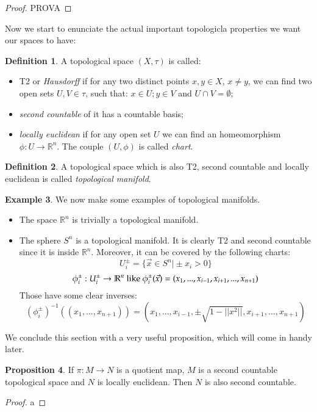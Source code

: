 \documentclass[12pt,a4paper]{report}
\theoremstyle{definition}
\newtheorem{Def}{Definition}[chapter]
\theoremstyle{Theorem}
\newtheorem{Prop}[Def]{Proposition}
\theoremstyle{break}
\newtheorem{Ex}[Def]{Example}
\theoremstyle{definition}
\begin{document}
			\begin{proof}
				PROVA
			\end{proof}
			Now we start to enunciate the actual important topologicla properties we want our spaces to have:
			\begin{Def}
				A topological space $(X,\tau)$ is called:
				\begin{itemize}
					\item T2 or \textit{Hausdorff} if for any two distinct points $x,y\in X$, $x\neq y$, we can find two open sets $U,V\in \tau$, such that: $x\in U;y\in V$ and $U\cap V=\emptyset$;
					\item \textit{second countable} of it has a countable basis;
					\item \textit{locally euclidean} if for any open set $U$ we can find an homeomorphism $\phi:U\rightarrow \mathbb{R}^n$. The couple $(U,\phi)$ is called \textit{chart}.	
				\end{itemize}
			\end{Def}
			\begin{Def}
				A topological space which is also T2, second countable and locally euclidean is called \textit{topological manifold}.
			\end{Def}
			\begin{Ex}
				We now make some examples of topological manifolds.
				\begin{itemize}
					\item The space $\mathbb{R}^n$ is trivially a topological manifold.
					\item The sphere $S^n$ is a topological manifold. It is clearly T2 and second countable since it is inside $\mathbb{R}^n$. Moreover, it can be covered by the following charts:
					$$U^{\pm}_i=\big\{\vec{x}\in S^n\big| \pm x_i>0\big\}$$
					$$\phi_i^\pm:U^\pm_i\rightarrow \mathbb{R}^n\hbox{ like }\phi^\pm_i(\vec{x})=(x_1,...,x_{i-1},x_{i+1},...,x_{n+1})$$
					Those have some clear inverses:
					$$(\phi^\pm_i)^{-1}((x_1,...,x_{n+1}))=(x_1,...,x_{i-1},\pm\sqrt{1-||x^2||},x_{i+1},...,x_{n+1})$$
				\end{itemize}
			\end{Ex}
			We conclude this section with a very useful proposition, which will come in handy later.
			\begin{Prop}
				If $\pi:M\rightarrow N$ is a quotient map, $M$ is a second countable topological space and $N$ is locally euclidean. Then $N$ is also second countable.
			\end{Prop}
			\begin{proof}
				a
			\end{proof}
\end{document}
